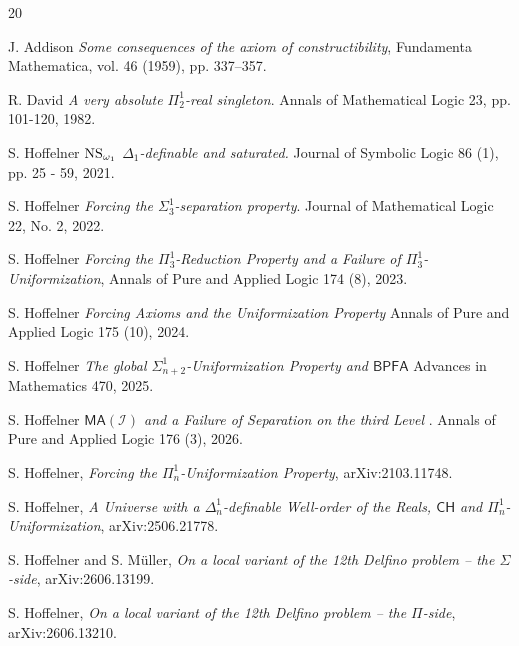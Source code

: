 \documentclass[a4paper,11pt]{article}
\newcommand{\BPFA}{\mathsf{BPFA}}
\begin{document}
    
    \begin{thebibliography}{20}
    
    
     J. Addison \textit{Some consequences of the axiom of constructibility}, Fundamenta Mathematica, vol. 46 (1959), pp. 337–357.
    
    
    
    
    R. David \textit{A very absolute $\Pi^1_2$-real singleton}. Annals of Mathematical Logic 23, pp. 101-120, 1982.
    
     S. Hoffelner \textit{$\hbox{NS}_{\omega_1}$ $\Delta_1$-definable and saturated.}  Journal of Symbolic Logic 86 (1), pp. 25 - 59, 2021.
   
  
     S. Hoffelner \textit{Forcing the $\Sigma^1_3$-separation property}. Journal of Mathematical Logic 22, No. 2, 2022.
    

      S. Hoffelner \textit{Forcing the $\Pi^1_3$-Reduction Property and a Failure of $\Pi^1_3$-Uniformization},  Annals of Pure and Applied Logic 174 (8), 2023.
      
     S. Hoffelner \textit{Forcing Axioms and the Uniformization Property} Annals of Pure and Applied Logic 175 (10), 2024.
    
    
      S. Hoffelner \textit{The global $\Sigma^1_{n+2}$-Uniformization Property and $\BPFA$} Advances in Mathematics 470, 2025.

      S. Hoffelner \textit{$\mathsf{MA} (\mathcal{I})$ and a Failure of Separation on the third Level }. Annals of Pure and Applied Logic 176 (3), 2026.

 
     S. Hoffelner, \textit{Forcing the $\Pi^1_n$-Uniformization Property}, arXiv:2103.11748.
    
    
    S. Hoffelner, \textit{A Universe with a $\Delta^1_n$-definable Well-order of the Reals, $\mathsf{CH}$ and $\Pi^1_n$-Uniformization}, arXiv:2506.21778.

     S. Hoffelner and S. M\"uller, \textit{On a local variant of the 12th Delfino problem -- the $\Sigma$-side}, arXiv:2606.13199.

     S. Hoffelner, \textit{On a local variant of the 12th Delfino problem -- the $\Pi$-side}, arXiv:2606.13210.
    

\end{thebibliography}
\end{document}
